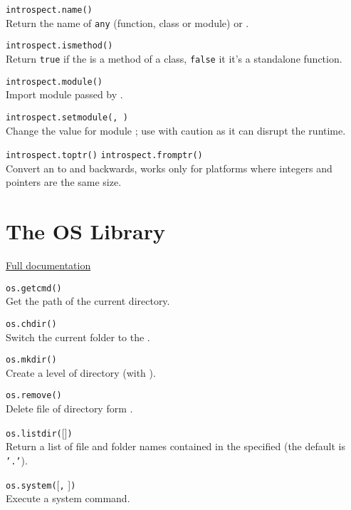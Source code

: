 \hangpar \texttt{introspect.name(}\texttt{)} \\
Return the name of \texttt{any} (function, class or module) or .

\hangpar \texttt{introspect.ismethod(}\texttt{)} \\
Return \texttt{true} if the  is a method of a class, \texttt{false} it it's a standalone function.

\hangpar \texttt{introspect.module(}\texttt{)} \\
Import module passed by .

\hangpar \texttt{introspect.setmodule(}\texttt{, }\texttt{)} \\
Change the value for module ; use with caution as it can disrupt the runtime.

\hangpar \texttt{introspect.toptr(}\texttt{)}  \texttt{introspect.fromptr(}\texttt{)} \\
Convert an  to  and backwards, works only for platforms where integers and pointers are the same size.

\newpage
\section*{The OS Library}

\hangpar \href{https://github.com/berry-lang/berry/wiki/Chapter-7\#module-os}{Full documentation}

\hangpar \texttt{os.getcmd()} \\
Get the path of the current directory.

\hangpar \texttt{os.chdir(}\texttt{)} \\
Switch the current folder to the .

\hangpar \texttt{os.mkdir(}\texttt{)} \\
Create a level of directory (with ).

\hangpar \texttt{os.remove(}\texttt{)} \\
Delete file of directory form .

\hangpar \texttt{os.listdir(}[]\texttt{)} \\
Return a list of file and folder names contained in the specified  (the default is \texttt{'.'}).

\hangpar \texttt{os.system(}[\texttt{,} ]\texttt{)} \\
Execute a system command.


